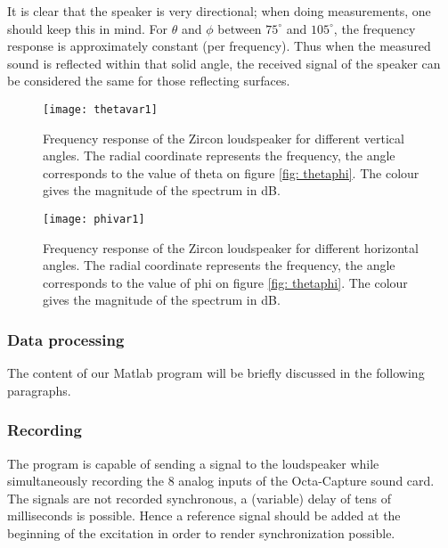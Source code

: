 It is clear that the speaker is very directional; when doing measurements, one should keep this in mind. For $\theta$ and $\phi$ between $75^{\circ}$ and $105^{\circ}$, the frequency response is approximately constant (per frequency). Thus when the measured sound is reflected within that solid angle, the received signal of the speaker can be considered the same for those reflecting surfaces.

\begin{figure}[h!]
  \centering
    \texttt{[image: thetavar1]}
  \caption{Frequency response of the Zircon loudspeaker for different vertical angles. The radial coordinate represents the frequency, the angle corresponds to the value of theta on figure \ref{fig: thetaphi}. The colour gives the magnitude of the spectrum in dB.}
  \label{fig: thetavar}
\end{figure}

\begin{figure}[h!]
  \centering
    \texttt{[image: phivar1]}
  \caption{Frequency response of the Zircon loudspeaker for different horizontal angles. The radial coordinate represents the frequency, the angle corresponds to the value of phi on figure \ref{fig: thetaphi}. The colour gives the magnitude of the spectrum in dB.}
  \label{fig: phivar}
\end{figure}




\subsubsection{Data processing}\label{processing}
The content of our Matlab program will be briefly discussed in the following paragraphs. 
\subsubsection*{Recording}
The program is capable of sending a signal to the loudspeaker while simultaneously recording the 8 analog inputs of the Octa-Capture sound card. The signals are not recorded synchronous, a (variable) delay of tens of  milliseconds is possible. Hence a reference signal should be added at the beginning of the excitation in order to render synchronization possible.

